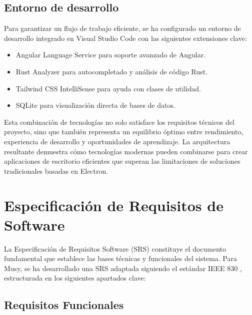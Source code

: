 \documentclass[11pt, a4paper]{article}
\begin{document}
  \subsection{Entorno de desarrollo}

  Para garantizar un flujo de trabajo eficiente, se ha configurado un entorno de desarrollo integrado en Visual Studio Code con las siguientes extensiones clave:
  \begin{itemize}
      \item Angular Language Service para soporte avanzado de Angular.
      \item Rust Analyzer para autocompletado y análisis de código Rust.
      \item Tailwind CSS IntelliSense para ayuda con clases de utilidad.
      \item SQLite para visualización directa de bases de datos.
  \end{itemize}

Esta combinación de tecnologías no solo satisface los requisitos técnicos del proyecto, sino que también representa un equilibrio óptimo entre rendimiento, experiencia de desarrollo y oportunidades de aprendizaje. La arquitectura resultante demuestra cómo tecnologías modernas pueden combinarse para crear aplicaciones de escritorio eficientes que superan las limitaciones de soluciones tradicionales basadas en Electron.

\section{Especificación de Requisitos de Software}

La Especificación de Requisitos Software (SRS) constituye el documento fundamental que establece las bases técnicas y funcionales del sistema. Para Musy, se ha desarrollado una SRS adaptada siguiendo el estándar IEEE 830 \textcite{IEEE830}, estructurada en los siguientes apartados clave:

  \subsection{Requisitos Funcionales}
\end{document}
